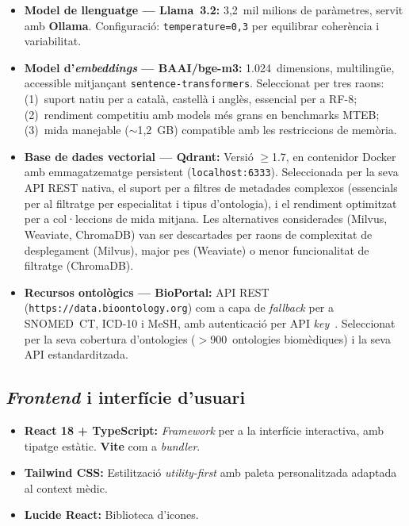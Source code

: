 \documentclass[CAT]{TFUOC}%
\begin{document}
\begin{itemize}
    \item \textbf{Model de llenguatge --- Llama~3.2:} 3,2~mil milions de paràmetres, servit amb \textbf{Ollama}. Configuració: \texttt{temperature=0,3} per equilibrar coherència i variabilitat.

    \item \textbf{Model d'\textit{embeddings} --- BAAI/bge-m3:} 1.024~dimensions, multilingüe, accessible mitjançant \texttt{sentence-transformers}. Seleccionat per tres raons: (1)~suport natiu per a català, castellà i anglès, essencial per a RF-8; (2)~rendiment competitiu amb models més grans en benchmarks MTEB; (3)~mida manejable ($\sim$1,2~GB) compatible amb les restriccions de memòria.

    \item \textbf{Base de dades vectorial --- Qdrant:} Versió $\geq$1.7, en contenidor Docker amb emmagatzematge persistent (\texttt{localhost:6333}). Seleccionada per la seva API REST nativa, el suport per a filtres de metadades complexos (essencials per al filtratge per especialitat i tipus d'ontologia), i el rendiment optimitzat per a col·leccions de mida mitjana. Les alternatives considerades (Milvus, Weaviate, ChromaDB) van ser descartades per raons de complexitat de desplegament (Milvus), major pes (Weaviate) o menor funcionalitat de filtratge (ChromaDB).

    \item \textbf{Recursos ontològics --- BioPortal:} API REST (\texttt{https://data.bioontology.org}) com a capa de \textit{fallback} per a SNOMED~CT, ICD-10 i MeSH, amb autenticació per API \textit{key}~\cite{vendetti2025bioportal}. Seleccionat per la seva cobertura d'ontologies ($>$900~ontologies biomèdiques) i la seva API estandarditzada.
\end{itemize}

\subsection{\textit{Frontend} i interfície d'usuari}

\begin{itemize}
    \item \textbf{React 18 + TypeScript:} \textit{Framework} per a la interfície interactiva, amb tipatge estàtic. \textbf{Vite} com a \textit{bundler}.

    \item \textbf{Tailwind CSS:} Estilització \textit{utility-first} amb paleta personalitzada adaptada al context mèdic.

    \item \textbf{Lucide React:} Biblioteca d'icones.
\end{itemize}
\end{document}
